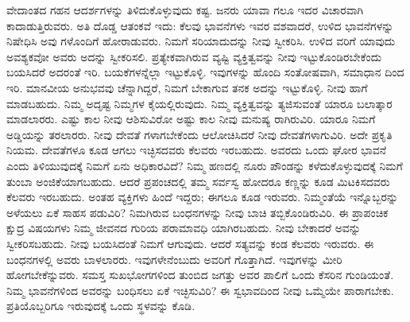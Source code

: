 ವೇದಾಂತದ ಗಹನ ಆದರ್ಶಗಳನ್ನು ತಿಳಿದುಕೊಳ್ಳುವುದು ಕಷ್ಟ. ಜನರು ಯಾವಾ ಗಲೂ ಇದರ ವಿಚಾರವಾಗಿ ಕಾದಾಡುತ್ತಿರುವರು. ಅತಿ ದೊಡ್ಡ ಆತಂಕವೆ ಇದು: ಕೆಲವು ಭಾವನೆಗಳು ಇವರ ವಶವಾದರೆ, ಉಳಿದ ಭಾವನೆಗಳನ್ನು ನಿಷೇಧಿಸಿ ಅವು ಗಳೊಂದಿಗೆ ಹೋರಾಡುವರು. ನಿಮಗೆ ಸರಿಯಾದುದನ್ನು ನೀವು ಸ್ವೀಕರಿಸಿ. ಉಳಿದ ವರಿಗೆ ಯಾವುದು ಅವಶ್ಯಕವೋ ಅವರು ಅದನ್ನು ಸ್ವೀಕರಿಸಲಿ. ಪ್ರತ್ಯೇಕವಾಗಿರುವ ವ್ಯಷ್ಟಿ ವ್ಯಕ್ತಿತ್ವವನ್ನು ನೀವು ಇಟ್ಟುಕೊಂಡಿರಬೇಕೆಂದು ಬಯಸಿದರೆ ಅದರಂತೆ ಇರಿ. ಬಯಕೆಗಳನ್ನೆಲ್ಲಾ ಇಟ್ಟುಕೊಳ್ಳಿ. ಇವುಗಳನ್ನು ಹೊಂದಿ ಸಂತೋಷವಾಗಿ, ಸಮಾಧಾನ ದಿಂದ ಇರಿ. ಮಾನವೀಯ ಅನುಭವವು ಚೆನ್ನಾಗಿದ್ದರೆ, ನಿಮಗೆ ಬೇಕಾಗುವ ತನಕ ಅದನ್ನು ಇಟ್ಟುಕೊಳ್ಳಿ. ನೀವು ಹಾಗೆ ಮಾಡಬಹುದು. ನಿಮ್ಮ ಅದೃಷ್ಟ ನಿಮ್ಮಗಳ ಕೈಯಲ್ಲಿರುವುದು. ನಿಮ್ಮ ವ್ಯಕ್ತಿತ್ವವನ್ನು ತ್ಯಜಿಸುವಂತೆ ಯಾರೂ ಬಲಾತ್ಕಾರ ಮಾಡಲಾರರು. ಎಷ್ಟು ಕಾಲ ನೀವು ಆಶಿಸುವಿರೋ ಅಷ್ಟು ಕಾಲ ನೀವು ಮನುಷ್ಯ ರಾಗಿರುವಿರಿ. ಯಾರೂ ನಿಮಗೆ ಅಡ್ಡಿಯನ್ನು ತರಲಾರರು. ನೀವು ದೇವತೆ ಗಳಾಗಬೇಕೆಂದು ಆಲೋಚಿಸಿದರೆ ನೀವು ದೇವತೆಗಳಾಗುವಿರಿ. ಅದೇ ಪ್ರಕೃತಿ ನಿಯಮ. ದೇವತೆಗಳೂ ಕೂಡ ಆಗಲು ಇಚ್ಛಿಸದವರು ಕೆಲವರು ಇರಬಹುದು. ಅವರದು ಒಂದು ಘೋರ ಭಾವನೆ ಎಂದು ತಿಳಿಯುವುದಕ್ಕೆ ನಿಮಗೆ ಏನು ಅಧಿಕಾರವಿದೆ? ನಿಮ್ಮ ಹಣದಲ್ಲಿ ನೂರು ಪೌಂಡನ್ನು ಕಳೆದುಕೊಳ್ಳುವುದಕ್ಕೆ ನಿಮಗೆ ತುಂಬಾ ಅಂಜಿಕೆಯಾಗಬಹುದು. ಆದರೆ ಪ್ರಪಂಚದಲ್ಲಿ ತಮ್ಮ ಸರ್ವಸ್ವ ಹೋದರೂ ಕಣ್ಣನ್ನು ಕೂಡ ಮಿಟಕಿಸದವರು ಕೆಲವರು ಇರಬಹುದು. ಅಂತಹ ವ್ಯಕ್ತಿಗಳು ಹಿಂದೆ ಇದ್ದರು; ಈಗಲೂ ಕೂಡ ಇರುವರು. ನಿಮ್ಮಂತೆಯೆ ಇನ್ನೊಬ್ಬರನ್ನು ಅಳೆಯಲು ಏಕೆ ಸಾಹಸ ಪಡುವಿರಿ? ನಿಮಗಿರುವ ಬಂಧನಗಳನ್ನು ನೀವು ಬಾಚಿ ತಬ್ಬಿಕೊಂಡಿರುವಿರಿ. ಈ ಪ್ರಾಪಂಚಿಕ ಕ್ಷುದ್ರ ವಿಷಯಗಳು ನಿಮ್ಮ ಜೀವನದ ಗುರಿಯ ಪರಾಮಾವಧಿ ಯಾಗಿರಬಹುದು. ನೀವು ಬೇಕಾದರೆ ಅವನ್ನು ಸ್ವೀಕರಿಸಬಹುದು. ನೀವು ಬಯಸಿದಂತೆ ನಿಮಗೆ ಆಗುವುದು. ಆದರೆ ಸತ್ಯವನ್ನು ಕಂಡ ಕೆಲವರು ಇರುವರು. ಈ ಬಂಧನಗಳಲ್ಲಿ ಅವರು ಬಾಳಲಾರರು. ಇವುಗಳೇನೆಂಬುದು ಅವರಿಗೆ ಗೊತ್ತಾಗಿದೆ. ಇವುಗಳನ್ನು ಮೀರಿ ಹೋಗಬೇಕೆನ್ನುವರು. ಸಮಸ್ತ ಸುಖಭೋಗಗಳಿಂದ ತುಂಬಿದ ಜಗತ್ತು ಅವರ ಪಾಲಿಗೆ ಒಂದು ಕೆಸರಿನ ಗುಂಡಿಯಂತೆ. ನಿಮ್ಮ ಭಾವನೆಗಳಿಂದ ಅವರನ್ನು ಬಂಧಿಸಲು ಏಕೆ ಇಚ್ಛಿಸುವಿರಿ? ಈ ಸ್ವಭಾವದಿಂದ ನೀವು ಒಮ್ಮೆಯೇ ಪಾರಾಗಬೇಕು. ಪ್ರತಿಯೊಬ್ಬರಿಗೂ ಇರುವುದಕ್ಕೆ ಒಂದು ಸ್ಥಳವನ್ನು ಕೊಡಿ.

